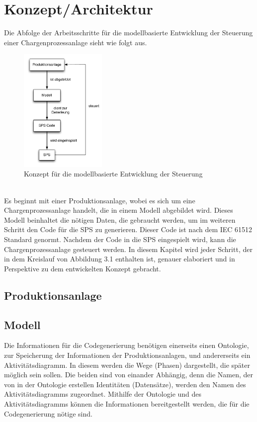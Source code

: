 
\chapter{Konzept/Architektur} \label{chapter:architecture}
Die Abfolge der Arbeitsschritte für die modellbasierte Entwicklung der Steuerung einer Chargenprozessanlage sieht wie folgt aus. 
\begin{figure}[h!]
		\centering
		\includegraphics[width=0.37\textwidth]{graphics/konzept/konzept_allblack.pdf}
		\caption{Konzept für die modellbasierte Entwicklung der Steuerung}
\end{figure} \\
Es beginnt mit einer Produktionsanlage, wobei es sich um eine Chargenprozessanlage handelt, die in einem Modell abgebildet wird. Dieses Modell beinhaltet die nötigen Daten, die gebraucht werden, um im weiteren Schritt den Code für die SPS zu generieren. Dieser Code ist nach dem IEC 61512 Standard genormt. Nachdem der Code in die SPS eingespielt wird, kann die Chargenprozessanlage gesteuert werden. 
In diesem Kapitel wird jeder Schritt, der in dem Kreislauf von Abbildung 3.1 enthalten ist, genauer elaboriert und in Perspektive zu dem entwickelten Konzept gebracht.
\section{Produktionsanlage}
\section{Modell}
Die Informationen für die Codegenerierung benötigen einerseits einen Ontologie, zur Speicherung der Informationen der Produktionsanlagen,  und andererseits ein Aktivitätsdiagramm. In diesem werden die Wege (Phasen) dargestellt, die später möglich sein sollen.
Die beiden sind von einander Abhängig, denn die Namen, der von in der Ontologie erstellen Identitäten (Datensätze), werden den Namen des Aktivitätsdiagramms zugeordnet.
Mithilfe der Ontologie und des Aktivitätsdiagramms können die Informationen bereitgestellt werden, die für die Codegenerierung nötige sind.  

